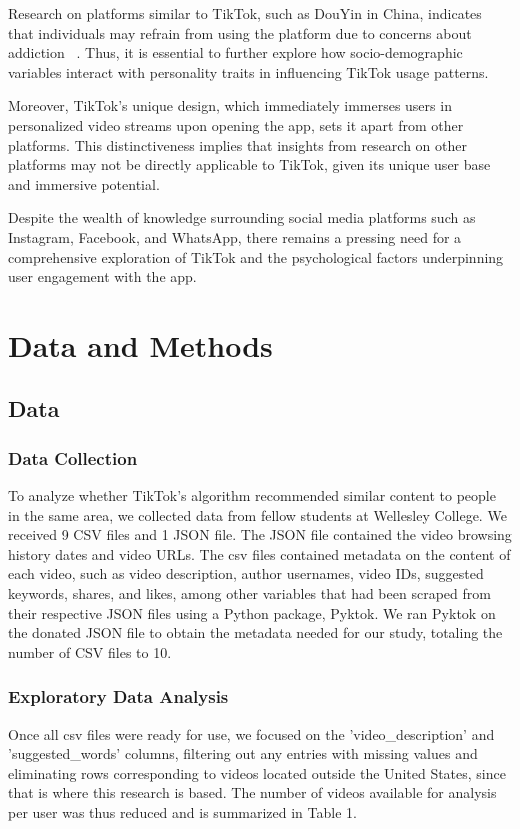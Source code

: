 \documentclass[acmtog]{acmart}
\begin{document}
Research on platforms similar to TikTok, such as DouYin in China, indicates that individuals may refrain from using the platform due to concerns about addiction ~\cite{montag2021psychology}. Thus, it is essential to further explore how socio-demographic variables interact with personality traits in influencing TikTok usage patterns.

Moreover, TikTok's unique design, which immediately immerses users in personalized video streams upon opening the app, sets it apart from other platforms. This distinctiveness implies that insights from research on other platforms may not be directly applicable to TikTok, given its unique user base and immersive potential.

Despite the wealth of knowledge surrounding social media platforms such as Instagram, Facebook, and WhatsApp, there remains a pressing need for a comprehensive exploration of TikTok and the psychological factors underpinning user engagement with the app.

\section{Data and Methods}

\subsection{Data}
\subsubsection{Data Collection}
To analyze whether TikTok’s algorithm recommended similar content to people in the same area, we collected data from fellow students at Wellesley College. We received 9 CSV files and 1 JSON file. The JSON file contained the video browsing history dates and video URLs. The csv files contained metadata on the content of each video, such as video description, author usernames, video IDs, suggested keywords, shares, and likes, among other variables that had been scraped from their respective JSON files using a Python package, Pyktok. We ran Pyktok on the donated JSON file to obtain the metadata needed for our study, totaling the number of CSV files to 10.

\subsubsection{Exploratory Data  Analysis}
Once all csv files were ready for use, we focused on the 'video\_description' and 'suggested\_words' columns, filtering out any entries with missing values and eliminating rows corresponding to videos located outside the United States, since that is where this research is based. The number of videos available for analysis per user was thus reduced and is summarized in Table 1.
\end{document}
